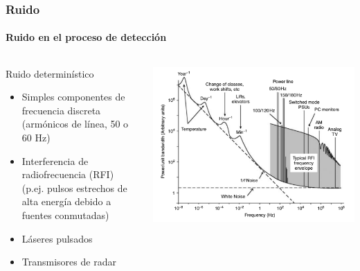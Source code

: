 \documentclass{beamer}
\begin{document}
\begin{frame}
\frametitle{Ruido}
\framesubtitle{Ruido en el proceso de detección}
\begin{columns}
\begin{column}{0.5\textwidth}
\begin{block}{Ruido determinístico}
\begin{itemize}
\item Simples componentes de frecuencia discreta (armónicos de línea, 50 o 60 Hz)
\item Interferencia de radiofrecuencia (RFI) (p.ej. pulsos estrechos de alta
energía debido a fuentes conmutadas)
\item Láseres pulsados
\item Transmisores de radar
\end{itemize}
\end{block}
\end{column}
\begin{column}{0.5\textwidth}
\begin{center}
\includegraphics[width=\textwidth]{d1/environmental_noise_spectrum}
\end{center}
\end{column}
\end{columns}
\end{frame} 
\end{document}
